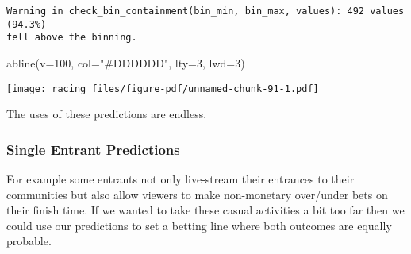\documentclass[
  letterpaper,
  DIV=11,
  numbers=noendperiod]{scrartcl}
\newenvironment{Shaded}{\begin{snugshade}}{\end{snugshade}}
\newcommand{\AttributeTok}[1]{\textcolor[rgb]{0.40,0.45,0.13}{#1}}
\newcommand{\DecValTok}[1]{\textcolor[rgb]{0.68,0.00,0.00}{#1}}
\newcommand{\FunctionTok}[1]{\textcolor[rgb]{0.28,0.35,0.67}{#1}}
\newcommand{\NormalTok}[1]{\textcolor[rgb]{0.00,0.23,0.31}{#1}}
\newcommand{\OtherTok}[1]{\textcolor[rgb]{0.00,0.23,0.31}{#1}}
\newcommand{\SpecialCharTok}[1]{\textcolor[rgb]{0.37,0.37,0.37}{#1}}
\newcommand{\StringTok}[1]{\textcolor[rgb]{0.13,0.47,0.30}{#1}}
\begin{document}
\begin{Shaded}
\end{Shaded}

\begin{verbatim}
Warning in check_bin_containment(bin_min, bin_max, values): 492 values (94.3%)
fell above the binning.
\end{verbatim}

\begin{Shaded}
\begin{Highlighting}[]
\FunctionTok{abline}\NormalTok{(}\AttributeTok{v=}\DecValTok{100}\NormalTok{, }\AttributeTok{col=}\StringTok{"\#DDDDDD"}\NormalTok{, }\AttributeTok{lty=}\DecValTok{3}\NormalTok{, }\AttributeTok{lwd=}\DecValTok{3}\NormalTok{)}
\end{Highlighting}
\end{Shaded}

\texttt{[image: racing\_files/figure-pdf/unnamed-chunk-91-1.pdf]}

The uses of these predictions are endless.

\subsubsection{Single Entrant
Predictions}\label{single-entrant-predictions}

For example some entrants not only live-stream their entrances to their
communities but also allow viewers to make non-monetary over/under bets
on their finish time. If we wanted to take these casual activities a bit
too far then we could use our predictions to set a betting line where
both outcomes are equally probable.
\end{document}
